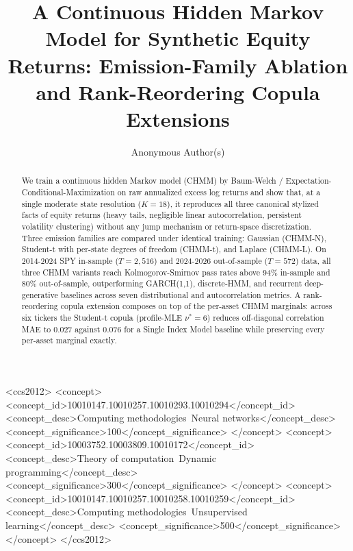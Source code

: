 \documentclass[sigconf,anonymous,nonacm=true]{acmart}
\title{A Continuous Hidden Markov Model for Synthetic Equity Returns:
  Emission-Family Ablation and Rank-Reordering Copula Extensions}
\author{Anonymous Author(s)}
\affiliation{%
  \institution{Submission to ICAIF 2026 (double-blind)}
  \city{}
  \country{}
}
\begin{document}
\begin{abstract}
We train a continuous hidden Markov model (CHMM) by Baum-Welch /
Expectation-Conditional-Maximization on raw annualized excess log returns and
show that, at a single moderate state resolution ($K = 18$), it reproduces all
three canonical stylized facts of equity returns (heavy tails, negligible
linear autocorrelation, persistent volatility clustering) without any jump
mechanism or return-space discretization. Three emission families are
compared under identical training: Gaussian (CHMM-N), Student-t with
per-state degrees of freedom (CHMM-t), and Laplace (CHMM-L). On 2014-2024
SPY in-sample ($T = 2{,}516$) and 2024-2026 out-of-sample ($T = 572$) data,
all three CHMM variants reach Kolmogorov-Smirnov pass rates above $94\%$
in-sample and $80\%$ out-of-sample, outperforming GARCH(1,1), discrete-HMM,
and recurrent deep-generative baselines across seven distributional and
autocorrelation metrics. A rank-reordering copula extension composes on top
of the per-asset CHMM marginals: across six tickers the Student-t copula
(profile-MLE $\nu^{*} = 6$) reduces off-diagonal correlation MAE to $0.027$
against $0.076$ for a Single Index Model baseline while preserving every
per-asset marginal exactly.
\end{abstract}

\begin{CCSXML}
<ccs2012>
<concept>
<concept_id>10010147.10010257.10010293.10010294</concept_id>
<concept_desc>Computing methodologies~Neural networks</concept_desc>
<concept_significance>100</concept_significance>
</concept>
<concept>
<concept_id>10003752.10003809.10010172</concept_id>
<concept_desc>Theory of computation~Dynamic programming</concept_desc>
<concept_significance>300</concept_significance>
</concept>
<concept>
<concept_id>10010147.10010257.10010258.10010259</concept_id>
<concept_desc>Computing methodologies~Unsupervised learning</concept_desc>
<concept_significance>500</concept_significance>
</concept>
</ccs2012>
\end{CCSXML}



\maketitle
\end{document}
